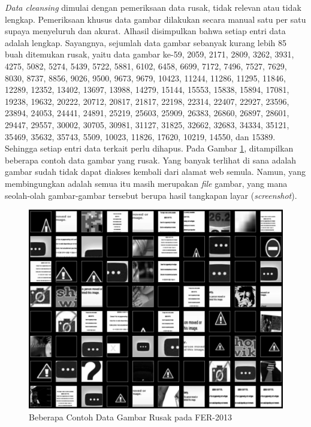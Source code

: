 \textit{Data cleansing} dimulai dengan pemeriksaan data rusak, tidak relevan atau tidak lengkap. Pemeriksaan khusus data gambar dilakukan secara manual satu per satu supaya menyeluruh dan akurat. Alhasil disimpulkan bahwa setiap entri data adalah lengkap. Sayangnya, sejumlah data gambar sebanyak kurang lebih 85 buah ditemukan rusak, yaitu data gambar ke-59, 2059, 2171, 2809, 3262, 3931, 4275, 5082, 5274, 5439, 5722, 5881, 6102, 6458, 6699, 7172, 7496, 7527, 7629, 8030, 8737, 8856, 9026, 9500, 9673, 9679, 10423, 11244, 11286, 11295, 11846, 12289, 12352, 13402, 13697, 13988, 14279, 15144, 15553, 15838, 15894, 17081, 19238, 19632, 20222, 20712, 20817, 21817, 22198, 22314, 22407, 22927, 23596, 23894, 24053, 24441, 24891, 25219, 25603, 25909, 26383, 26860, 26897, 28601, 29447, 29557, 30002, 30705, 30981, 31127, 31825, 32662, 32683, 34334, 35121, 35469, 35632, 35743, 5509, 10023, 11826, 17620, 10219, 14550, dan 15389. Sehingga setiap entri data terkait perlu dihapus. Pada Gambar \ref{fig:contohdatagambarrusak}, ditampilkan beberapa contoh data gambar yang rusak. Yang banyak terlihat di sana adalah gambar sudah tidak dapat diakses kembali dari alamat web semula. Namun, yang membingungkan adalah semua itu masih merupakan \textit{file} gambar, yang mana seolah-olah gambar-gambar tersebut berupa hasil tangkapan layar (\textit{screenshot}).
\begin{figure}[t]
    \centering
    \includegraphics[width=14cm]{gambar/fer2013_data_rusak.png}
    \caption{Beberapa Contoh Data Gambar Rusak pada FER-2013}
    \label{fig:contohdatagambarrusak}
\end{figure}


